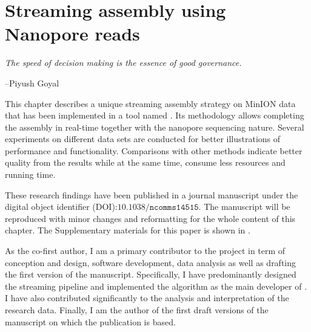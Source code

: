 \chapter{Streaming assembly using Nanopore reads}\label{ch:npscarf}
\thispagestyle{empty}
\vspace*{\fill}
\epigraph{\emph{The speed of decision making is the essence of good governance.}}
{--Piyush Goyal}

\clearpage
This chapter describes a unique streaming assembly strategy on MinION data that has been implemented in a tool named \npscarf{}. Its methodology allows completing the assembly in real-time together with the nanopore sequencing nature. Several experiments on different data sets are conducted for better illustrations of \npscarf{} performance and functionality. Comparisons with other methods indicate better quality from the results while at the same time, consume less resources and running time.

These research findings have been published in a journal manuscript under the digital object identifier (DOI):$\mathtt{10.1038/ncomms14515}$. The manuscript will be reproduced with minor changes and reformatting for the whole content of this chapter.
The Supplementary materials for this paper is shown in .

As the co-first author, I am a primary contributor to the project in term of conception and design, software development, data analysis as well as drafting the first version of the manuscript. 
Specifically, I have predominantly designed the streaming pipeline and implemented the algorithm as the main developer of \npscarf{}. 
I have also contributed significantly to the analysis and interpretation of the research data. 
Finally, I am the author of the first draft versions of the manuscript on which the publication is based.

